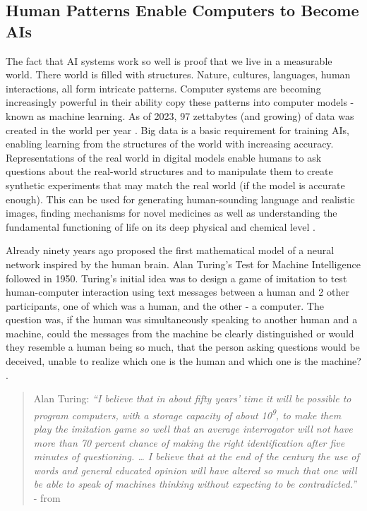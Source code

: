 \documentclass[
  letterpaper,
  DIV=11,
  numbers=noendperiod]{scrartcl}
\begin{document}
\subsection{Human Patterns Enable Computers to Become
AIs}\label{human-patterns-enable-computers-to-become-ais}

The fact that AI systems work so well is proof that we live in a
measurable world. There world is filled with structures. Nature,
cultures, languages, human interactions, all form intricate patterns.
Computer systems are becoming increasingly powerful in their ability
copy these patterns into computer models - known as machine learning. As
of 2023, 97 zettabytes (and growing) of data was created in the world
per year \citep{soundaryajayaramanHowBigBig2023}. Big data is a basic
requirement for training AIs, enabling learning from the structures of
the world with increasing accuracy. Representations of the real world in
digital models enable humans to ask questions about the real-world
structures and to manipulate them to create synthetic experiments that
may match the real world (if the model is accurate enough). This can be
used for generating human-sounding language and realistic images,
finding mechanisms for novel medicines as well as understanding the
fundamental functioning of life on its deep physical and chemical level
\citep{nopriorsInceptiveCEOJakob2023}.

Already ninety years ago \citep{mccullochLogicalCalculusIdeas1943}
proposed the first mathematical model of a neural network inspired by
the human brain. Alan Turing's Test for Machine Intelligence followed in
1950. Turing's initial idea was to design a game of imitation to test
human-computer interaction using text messages between a human and 2
other participants, one of which was a human, and the other - a
computer. The question was, if the human was simultaneously speaking to
another human and a machine, could the messages from the machine be
clearly distinguished or would they resemble a human being so much, that
the person asking questions would be deceived, unable to realize which
one is the human and which one is the machine?
\citep{turingCOMPUTINGMACHINERYINTELLIGENCE1950}.

\begin{quote}
Alan Turing: \emph{``I believe that in about fifty years' time it will
be possible to program computers, with a storage capacity of about
10\textsuperscript{9}, to make them play the imitation game so well that
an average interrogator will not have more than 70 percent chance of
making the right identification after five minutes of questioning.
\ldots{} I believe that at the end of the century the use of words and
general educated opinion will have altered so much that one will be able
to speak of machines thinking without expecting to be contradicted.''} -
from \citep{stanfordencyclopediaofphilosophyTuringTest2021}
\end{quote}
\end{document}
